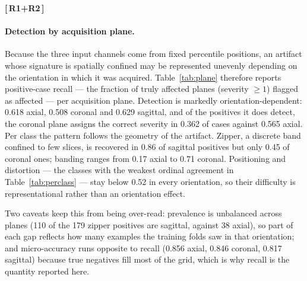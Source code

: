 \documentclass[runningheads]{llncs}
\newenvironment{revblock}[2]{\par\color{#1}\noindent\textbf{[\,#2\,]}\ \ignorespaces}{\par}
\begin{document}
\begin{revblock}{revboth}{R1+R2}
\paragraph{Detection by acquisition plane.}
Because the three input channels come from fixed percentile positions, an artifact
whose signature is spatially confined may be represented unevenly depending on the
orientation in which it was acquired. Table~\ref{tab:plane} therefore reports
positive-case recall --- the fraction of truly affected planes (severity $\ge1$)
flagged as affected --- per acquisition plane. Detection is markedly
orientation-dependent: 0.618 axial, 0.508 coronal and 0.629 sagittal, and of the
positives it does detect, the coronal plane assigns the correct severity in 0.362 of
cases against 0.565 axial. Per class the pattern follows the geometry of the artifact.
Zipper, a discrete band confined to few slices, is recovered in 0.86 of sagittal
positives but only 0.45 of coronal ones; banding ranges from 0.17 axial to 0.71
coronal. Positioning and distortion --- the classes with the weakest ordinal agreement
in Table~\ref{tab:perclass} --- stay below 0.52 in every orientation, so their
difficulty is representational rather than an orientation effect.

Two caveats keep this from being over-read: prevalence is unbalanced across planes
(110 of the 179 zipper positives are sagittal, against 38 axial), so part of each gap
reflects how many examples the training folds saw in that orientation; and
micro-accuracy runs opposite to recall (0.856 axial, 0.846 coronal, 0.817 sagittal)
because true negatives fill most of the grid, which is why recall is the quantity
reported here.


\end{revblock}
\end{document}
